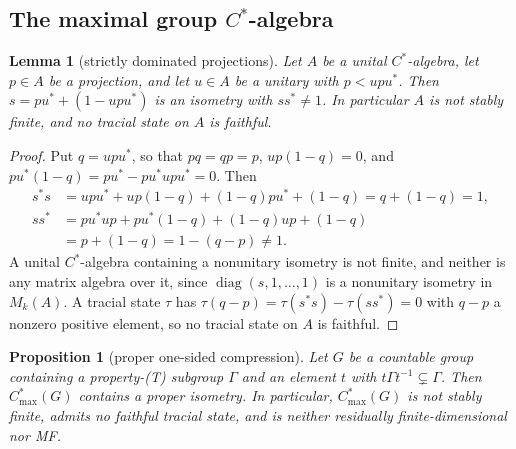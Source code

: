 \documentclass[11pt]{amsart}
\newcommand{\leanverified}[2]{\ignorespaces}
\newtheorem{proposition}[theorem]{Proposition}
\newtheorem{lemma}[theorem]{Lemma}
\theoremstyle{plain}
\begin{document}
\subsection{The maximal group \texorpdfstring{$C^*$}{C*}-algebra}

\begin{lemma}[strictly dominated projections]\label{lem:proper-isometry}
Let $A$ be a unital $C^*$-algebra, let $p\in A$ be a projection, and let
$u\in A$ be a unitary with $p<upu^{*}$.  Then $s=pu^{*}+(1-upu^{*})$ is
an isometry with $ss^*\ne1$.  In particular $A$ is not stably finite,
and no tracial state on $A$ is faithful.
\leanverified{Analysis/ProperIsometryStrictOrder}{GroupApproximation.manuscriptProperIsometryStrictOrder}
\end{lemma}

\begin{proof}
Put $q=upu^{*}$, so that $pq=qp=p$, $up(1-q)=0$, and
$pu^{*}(1-q)=pu^{*}-pu^{*}upu^{*}=0$.  Then
\begin{align*}
 s^{*}s&=upu^{*}+up(1-q)+(1-q)pu^{*}+(1-q)=q+(1-q)=1,\\
 ss^{*}&=pu^{*}up+pu^{*}(1-q)+(1-q)up+(1-q)\\
       &=p+(1-q)=1-(q-p)\ne1.
\end{align*}
A unital $C^*$-algebra containing a nonunitary isometry is not finite, and
neither is any matrix algebra over it, since
$\operatorname{diag}(s,1,\ldots,1)$ is a nonunitary isometry in $M_k(A)$.
A tracial state $\tau$ has
$\tau(q-p)=\tau(s^{*}s)-\tau(ss^{*})=0$ with $q-p$ a nonzero positive
element, so no tracial state on $A$ is faithful.
\end{proof}

\begin{proposition}[proper one-sided compression]\label{prop:max-infinite}
Let $G$ be a countable group containing a property-\textup{(T)} subgroup
$\Gamma$ and an element $t$ with $t\Gamma t^{-1}\subsetneq\Gamma$.  Then
$C^*_{\max}(G)$ contains a proper isometry.  In particular,
$C^*_{\max}(G)$ is not stably finite, admits no faithful tracial state,
and is neither residually finite-dimensional nor MF\@.
\leanverified{Analysis/StrictCompressionFromPrinted}{GroupApproximation.MaximalCStarPrintedHypotheses.manuscriptMaximalCStarRemarkFromPrintedHypotheses}
\leanverified{Analysis/QuasiRegularWitness}{GroupApproximation.QuasiRegularWitness.baseVector_apply_base}
\end{proposition}
\end{document}
